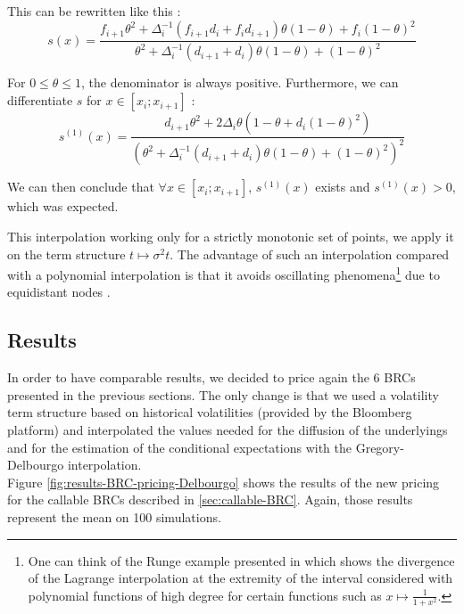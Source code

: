 \documentclass[a4paper,11pt,english]{book}
\begin{document}
This can be rewritten like this :
$$s(x)=\frac{f_{i+1}\theta^2 + \Delta_i^{-1}(f_{i+1}d_i+f_id_{i+1})\theta(1-\theta)+f_i(1-\theta)^2}{\theta^2+\Delta_i^{-1}(d_{i+1}+d_i)\theta(1-\theta)+(1-\theta)^2}$$

For $0 \leq \theta \leq 1$, the denominator is always positive. Furthermore, we can differentiate $s$ for $x\in[x_i;x_{i+1}]$ :
$$s^{(1)}(x) = \frac{d_{i+1}\theta^2+2\Delta_i\theta(1-\theta+d_i(1-\theta)^2)}{(\theta^2+\Delta_i^{-1}(d_{i+1}+d_i)\theta(1-\theta)+(1-\theta)^2)^2}$$

We can then conclude that $\forall x\in[x_i;x_{i+1}]$, $s^{(1)}(x)$ exists and $s^{(1)}(x)>0$, which was expected.

This interpolation working only for a strictly monotonic set of points, we apply it on the term structure $t \mapsto \sigma^2 t$. The advantage of such an interpolation compared with a polynomial interpolation is that it avoids oscillating phenomena\footnote{One can think of the Runge example presented in \cite{quarteroni2000methodes} which shows the divergence of the Lagrange interpolation at the extremity of the interval considered with polynomial functions of high degree for certain functions such as $x \mapsto \frac{1}{1+x^2}$.} due to equidistant nodes \cite{quarteroni2000methodes}.

\subsection{Results}
In order to have comparable results, we decided to price again the 6 BRCs presented in the previous sections. The only change is that we used a volatility term structure based on historical volatilities (provided by the Bloomberg platform) and interpolated the values needed for the diffusion of the underlyings and for the estimation of the conditional expectations with the Gregory-Delbourgo interpolation.\\

Figure \ref{fig:results-BRC-pricing-Delbourgo} shows the results of the new pricing for the callable BRCs described in \ref{sec:callable-BRC}. Again, those results represent the mean on 100 simulations.
\end{document}
